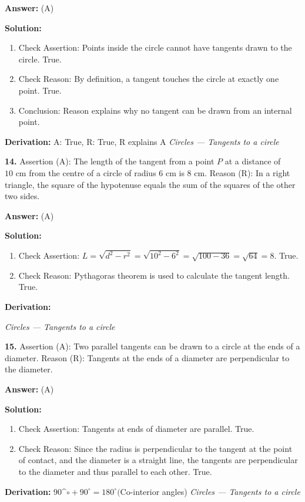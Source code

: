\documentclass[12pt,a4paper]{exam}
\newcommand{\fitmath}[1]{%
  \sbox{\schmathbox}{$\displaystyle #1$}%
  \ifdim\wd\schmathbox>\linewidth
    \resizebox{\linewidth}{!}{\usebox{\schmathbox}}%
  \else
    \usebox{\schmathbox}%
  \fi}
\begin{document}
\begin{questions}
\textbf{Answer:}
(A)

\textbf{Solution:}
\begin{enumerate}
  \item Check Assertion: Points inside the circle cannot have tangents drawn to the circle. True.
  \item Check Reason: By definition, a tangent touches the circle at exactly one point. True.
  \item Conclusion: Reason explains why no tangent can be drawn from an internal point.
\end{enumerate}
\textbf{Derivation:}
A: True, R: True, R explains A
\hfill \textit{Circles — Tangents to a circle}
\vspace{0.3cm}

\question \textbf{14.} Assertion (A): The length of the tangent from a point $P$ at a distance of $10 \text{ cm}$ from the centre of a circle of radius $6 \text{ cm}$ is $8 \text{ cm}$.
Reason (R): In a right triangle, the square of the hypotenuse equals the sum of the squares of the other two sides.

\textbf{Answer:}
(A)

\textbf{Solution:}
\begin{enumerate}
  \item Check Assertion: $L = \sqrt{d^2 - r^2} = \sqrt{10^2 - 6^2} = \sqrt{100 - 36} = \sqrt{64} = 8$. True.
  \item Check Reason: Pythagoras theorem is used to calculate the tangent length. True.
\end{enumerate}
\textbf{Derivation:}
\begin{center}
\fitmath{L = \sqrt{10^2 - 6^2} = 8}
\end{center}
\hfill \textit{Circles — Tangents to a circle}
\vspace{0.3cm}

\question \textbf{15.} Assertion (A): Two parallel tangents can be drawn to a circle at the ends of a diameter.
Reason (R): Tangents at the ends of a diameter are perpendicular to the diameter.

\textbf{Answer:}
(A)

\textbf{Solution:}
\begin{enumerate}
  \item Check Assertion: Tangents at ends of diameter are parallel. True.
  \item Check Reason: Since the radius is perpendicular to the tangent at the point of contact, and the diameter is a straight line, the tangents are perpendicular to the diameter and thus parallel to each other. True.
\end{enumerate}
\textbf{Derivation:}
90\textasciicircum{}$\circ + 90^\circ = 180^\circ ($Co-interior angles)
\hfill \textit{Circles — Tangents to a circle}
\vspace{0.3cm}


\end{questions}
\end{document}
